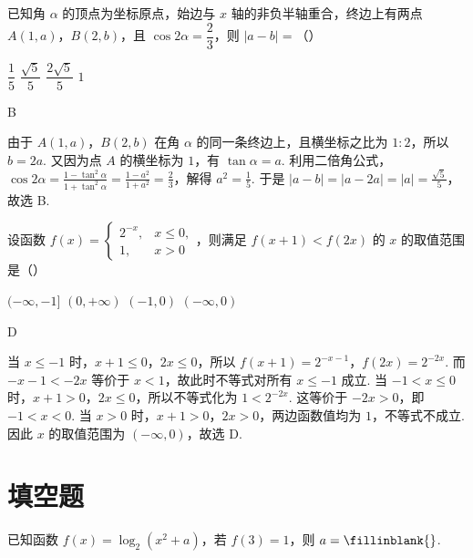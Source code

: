 \begin{problem}
已知角 \(\alpha\) 的顶点为坐标原点，始边与 \(x\) 轴的非负半轴重合，终边上有两点 \(A(1,a)\)，\(B(2,b)\)，且 \(\cos2\alpha=\dfrac23\)，则 \(|a-b|=\)（\quad）

\choices
    {\(\dfrac15\)}
    {\(\dfrac{\sqrt5}{5}\)}
    {\(\dfrac{2\sqrt5}{5}\)}
    {\(1\)}
\end{problem}

\begin{answer}
B
\end{answer}

\begin{solution}
由于 \(A(1,a)\)，\(B(2,b)\) 在角 \(\alpha\) 的同一条终边上，且横坐标之比为 \(1:2\)，所以 \(b=2a\). 又因为点 \(A\) 的横坐标为 \(1\)，有 \(\tan\alpha=a\). 利用二倍角公式，\(\cos2\alpha=\frac{1-\tan^2\alpha}{1+\tan^2\alpha}=\frac{1-a^2}{1+a^2}=\frac23\)，解得 \(a^2=\frac15\). 于是 \(|a-b|=|a-2a|=|a|=\frac{\sqrt5}{5}\)，故选 B.
\end{solution}

\begin{problem}
设函数 \(f(x)=\begin{cases}
2^{-x},&x\le0,\\
1,&x>0
\end{cases}\)，则满足 \(f(x+1)<f(2x)\) 的 \(x\) 的取值范围是（\quad）

\choices
    {\((-\infty,-1]\)}
    {\((0,+\infty)\)}
    {\((-1,0)\)}
    {\((-\infty,0)\)}
\end{problem}

\begin{answer}
D
\end{answer}

\begin{solution}
当 \(x\leq-1\) 时，\(x+1\leq0\)，\(2x\leq0\)，所以
\(f(x+1)=2^{-x-1}\)，\(f(2x)=2^{-2x}\). 而 \(-x-1<-2x\) 等价于 \(x<1\)，故此时不等式对所有 \(x\leq-1\) 成立.
当 \(-1<x\leq0\) 时，\(x+1>0\)，\(2x\leq0\)，所以不等式化为
\(1<2^{-2x}\). 这等价于 \(-2x>0\)，即 \(-1<x<0\). 当 \(x>0\) 时，\(x+1>0\)，\(2x>0\)，两边函数值均为 \(1\)，不等式不成立. 因此 \(x\) 的取值范围为 \((-\infty,0)\)，故选 D.
\end{solution}

\section{填空题}

\begin{problem}
已知函数 \(f(x)=\log_2(x^2+a)\)，若 \(f(3)=1\)，则 \(a=\fillinblank{}\).
\end{problem}

